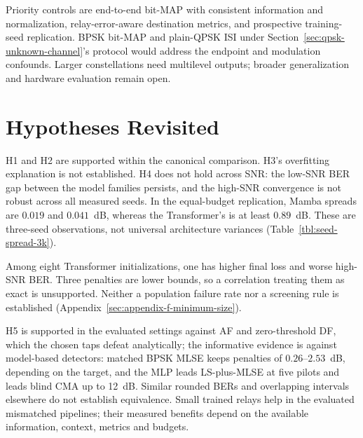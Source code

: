 Priority controls are end-to-end bit-MAP with consistent information and normalization, relay-error-aware destination metrics, and prospective training-seed replication. BPSK bit-MAP and plain-QPSK ISI under Section~\ref{sec:qpsk-unknown-channel}'s protocol would address the endpoint and modulation confounds. Larger constellations need multilevel outputs; broader generalization and hardware evaluation remain open.

\section{Hypotheses Revisited}\label{sec:conclusions}

H1 and H2 are supported within the canonical comparison. H3's overfitting explanation is not established. H4 does not hold across SNR: the low-SNR BER gap between the model families persists, and the high-SNR convergence is not robust across all measured seeds. In the equal-budget replication, Mamba spreads are $0.019$ and $0.041$~dB, whereas the Transformer's is at least $0.89$~dB. These are three-seed observations, not universal architecture variances (Table~\ref{tbl:seed-spread-3k}).

Among eight Transformer initializations, one has higher final loss and worse high-SNR BER. Three penalties are lower bounds, so a correlation treating them as exact is unsupported. Neither a population failure rate nor a screening rule is established (Appendix~\ref{sec:appendix-f-minimum-size}).

H5 is supported in the evaluated settings against AF and zero-threshold DF, which the chosen taps defeat analytically; the informative evidence is against model-based detectors: matched BPSK MLSE keeps penalties of $0.26$--$2.53$~dB, depending on the target, and the MLP leads LS-plus-MLSE at five pilots and leads blind CMA up to 12~dB. Similar rounded BERs and overlapping intervals elsewhere do not establish equivalence. Small trained relays help in the evaluated mismatched pipelines; their measured benefits depend on the available information, context, metrics and budgets.
